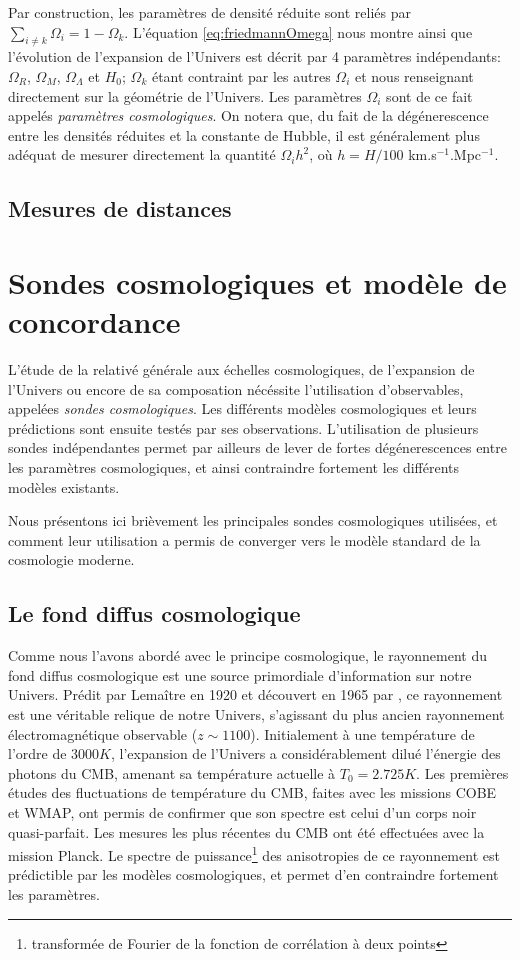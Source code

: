 \documentclass[../main/main.tex]{subfiles}
\begin{document}
Par construction, les paramètres de densité réduite sont reliés par
$\sum_{i\ne k}\Omega_{i}=1-\Omega_{k}$.
L'équation \ref{eq:friedmannOmega} nous montre ainsi que l'évolution de
l'expansion de l'Univers est décrit par 4 paramètres indépendants:
$\Omega_{R}$, $\Omega_{M}$, $\Omega_{\Lambda}$ et $H_{0}$; $\Omega_{k}$
étant contraint par les autres $\Omega_{i}$ et nous renseignant
directement sur la géométrie de l'Univers. Les paramètres $\Omega_{i}$
sont de ce fait appelés \textit{paramètres cosmologiques}. On notera
que, du fait de 
la dégénerescence entre les densités réduites et la constante de Hubble,
il est généralement plus adéquat de mesurer directement la quantité
$\Omega_{i}h^{2}$, où $h=H/100$ km.s$^{-1}$.Mpc$^{-1}$.

\subsection{Mesures de distances}
\section{Sondes cosmologiques et modèle de concordance \lcdm}\label{ssec:LCDM}

L'étude de la relativé générale aux échelles cosmologiques, de
l'expansion de l'Univers ou encore de sa composation nécéssite
l'utilisation d'observables, appelées \textit{sondes cosmologiques}.
Les différents modèles cosmologiques et leurs prédictions sont ensuite
testés par ses observations. L'utilisation de plusieurs sondes
indépendantes permet
par ailleurs de lever de fortes dégénerescences entre les paramètres
cosmologiques, et ainsi contraindre fortement les différents modèles
existants.

Nous présentons ici brièvement les principales sondes cosmologiques
utilisées, et comment leur utilisation a permis de converger vers le
modèle standard de la cosmologie moderne.

\subsection{Le fond diffus cosmologique}

Comme nous l'avons abordé avec le principe cosmologique, le rayonnement
du fond diffus cosmologique est une source primordiale d'information sur
notre Univers. Prédit par Lemaître en 1920 et découvert en 1965 par
\citet{Penzias1965}, ce rayonnement est une véritable relique de notre
Univers, s'agissant du plus ancien rayonnement électromagnétique
observable ($z\sim 1100$). Initialement à une température de l'ordre de
$3000K$, l'expansion de l'Univers a considérablement dilué l'énergie des
photons du CMB, amenant sa température actuelle à $T_{0}=2.725K$. Les
premières études des fluctuations de température du CMB, faites avec les missions COBE et WMAP, ont
permis de confirmer que son spectre est celui d'un corps noir
quasi-parfait. Les mesures les plus récentes du CMB ont été effectuées avec la mission
Planck.
Le spectre de puissance\footnote{transformée
de Fourier de la fonction de corrélation à deux points} des anisotropies
de ce rayonnement est prédictible par les modèles cosmologiques, et
permet d'en contraindre fortement les paramètres.
\end{document}
